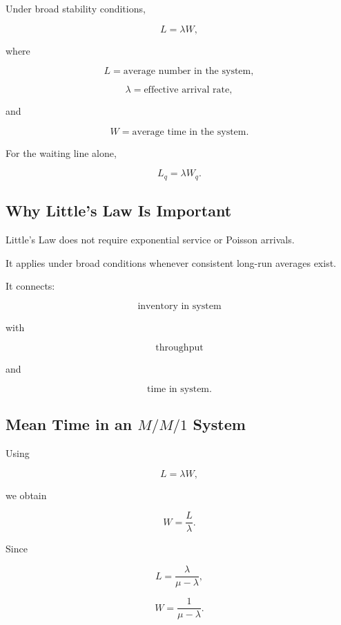 \begin{theorem}
Under broad stability conditions,

\[
\boxed{
L
=
\lambda W,
}
\]

where

\[
L
=
\text{average number in the system},
\]

\[
\lambda
=
\text{effective arrival rate},
\]

and

\[
W
=
\text{average time in the system}.
\]
\end{theorem}

For the waiting line alone,

\[
\boxed{
L_q
=
\lambda W_q.
}
\]

\subsection{Why Little's Law Is Important}
\label{subsec:why-littles-law-important}

Little's Law does not require exponential service or Poisson arrivals.

It applies under broad conditions whenever consistent long-run averages
exist.

It connects:

\[
\boxed{
\text{inventory in system}
}
\]

with

\[
\boxed{
\text{throughput}
}
\]

and

\[
\boxed{
\text{time in system}.
}
\]

\subsection{Mean Time in an \(M/M/1\) System}
\label{subsec:mm1-W}

Using

\[
L=\lambda W,
\]

we obtain

\[
W
=
\frac{L}{\lambda}.
\]

Since

\[
L
=
\frac{\lambda}{\mu-\lambda},
\]

\[
\boxed{
W
=
\frac1{\mu-\lambda}.
}
\]

